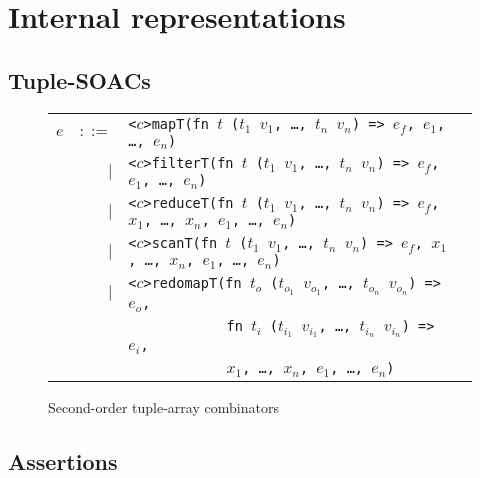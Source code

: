 \chapter{Internal representations}
\label{chap:internal}

\section{Tuple-SOACs}

\begin{figure}[bt]
\begin{tabular}{lrll}
$e$ & $::=$ & \texttt{<$c$>mapT(fn $t$ ($t_{1}$ $v_{1}$, \ldots, $t_{n}$ $v_{n}$) => $e_f$, $e_{1}$, \ldots, $e_{n}$)} \\
    & $|$ & \texttt{<$c$>filterT(fn $t$ ($t_{1}$ $v_{1}$, \ldots, $t_{n}$ $v_{n}$) => $e_f$, $e_{1}$, \ldots, $e_{n}$)} \\
    & $|$ & \texttt{<$c$>reduceT(fn $t$ ($t_{1}$ $v_{1}$, \ldots, $t_{n}$ $v_{n}$) => $e_f$, $x_{1}$, \ldots, $x_{n}$, $e_{1}$, \ldots, $e_{n}$)} \\
    & $|$ & \texttt{<$c$>scanT(fn $t$ ($t_{1}$ $v_{1}$, \ldots, $t_{n}$ $v_{n}$) => $e_f$, $x_{1}$, \ldots, $x_{n}$, $e_{1}$, \ldots, $e_{n}$)} \\
    & $|$ & \texttt{<$c$>redomapT(fn $t_{o}$ ($t_{o_{1}}$ $v_{o_{1}}$, \ldots, $t_{o_{n}}$ $v_{o_{n}}$) => $e_o$,} \\
    &     & \texttt{\ \ \ \ \ \ \ \ \ \ \ \ fn $t_{i}$ ($t_{i_{1}}$ $v_{i_{1}}$, \ldots, $t_{i_{n}}$ $v_{i_{n}}$) => $e_i$,} \\
    &     & \texttt{\ \ \ \ \ \ \ \ \ \ \ \ $x_{1}$, \ldots, $x_{n}$, $e_{1}$, \ldots, $e_{n}$)} \\
\end{tabular}
\caption{Second-order tuple-array combinators}
\label{fig:tuple-soacs}
\end{figure}

\section{Assertions}

